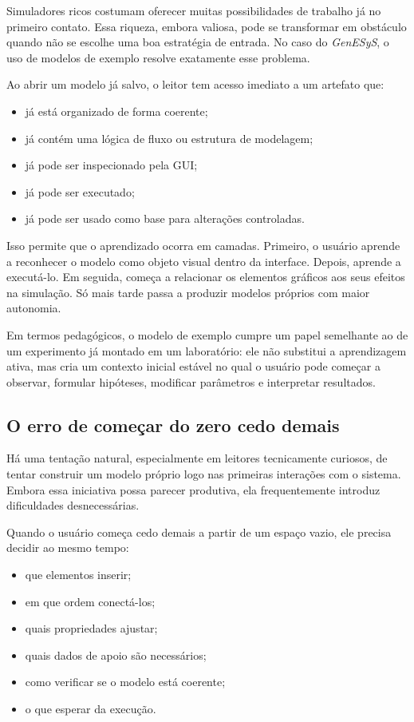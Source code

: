 Simuladores ricos costumam oferecer muitas possibilidades de trabalho já no primeiro contato. Essa riqueza, embora valiosa, pode se transformar em obstáculo quando não se escolhe uma boa estratégia de entrada. No caso do \textit{GenESyS}, o uso de modelos de exemplo resolve exatamente esse problema.

Ao abrir um modelo já salvo, o leitor tem acesso imediato a um artefato que:
\begin{itemize}
    \item já está organizado de forma coerente;
    \item já contém uma lógica de fluxo ou estrutura de modelagem;
    \item já pode ser inspecionado pela GUI;
    \item já pode ser executado;
    \item já pode ser usado como base para alterações controladas.
\end{itemize}

Isso permite que o aprendizado ocorra em camadas. Primeiro, o usuário aprende a reconhecer o modelo como objeto visual dentro da interface. Depois, aprende a executá-lo. Em seguida, começa a relacionar os elementos gráficos aos seus efeitos na simulação. Só mais tarde passa a produzir modelos próprios com maior autonomia.

Em termos pedagógicos, o modelo de exemplo cumpre um papel semelhante ao de um experimento já montado em um laboratório: ele não substitui a aprendizagem ativa, mas cria um contexto inicial estável no qual o usuário pode começar a observar, formular hipóteses, modificar parâmetros e interpretar resultados.

\subsection{O erro de começar do zero cedo demais}
\label{subsec:cap4_erro_comecar_do_zero}

Há uma tentação natural, especialmente em leitores tecnicamente curiosos, de tentar construir um modelo próprio logo nas primeiras interações com o sistema. Embora essa iniciativa possa parecer produtiva, ela frequentemente introduz dificuldades desnecessárias.

Quando o usuário começa cedo demais a partir de um espaço vazio, ele precisa decidir ao mesmo tempo:
\begin{itemize}
    \item que elementos inserir;
    \item em que ordem conectá-los;
    \item quais propriedades ajustar;
    \item quais dados de apoio são necessários;
    \item como verificar se o modelo está coerente;
    \item o que esperar da execução.
\end{itemize}

